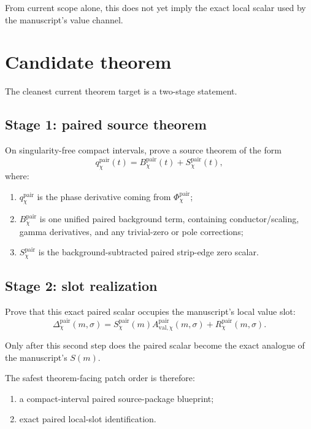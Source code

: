\documentclass[11pt]{article}
\begin{document}
From current scope alone, this does not yet imply the exact local scalar used by
the manuscript's value channel.

\section{Candidate theorem}

The cleanest current theorem target is a two-stage statement.

\subsection*{Stage 1: paired source theorem}

On singularity-free compact intervals, prove a source theorem of the form
\[
q_\chi^{\mathrm{pair}}(t)=B_\chi^{\mathrm{pair}}(t)+S_\chi^{\mathrm{pair}}(t),
\]
where:

\begin{enumerate}
\item \(q_\chi^{\mathrm{pair}}\) is the phase derivative coming from
\(\Phi_\chi^{\mathrm{pair}}\);
\item \(B_\chi^{\mathrm{pair}}\) is one unified paired background term,
containing conductor/scaling, gamma derivatives, and any trivial-zero or pole
corrections;
\item \(S_\chi^{\mathrm{pair}}\) is the background-subtracted paired strip-edge
zero scalar.
\end{enumerate}

\subsection*{Stage 2: slot realization}

Prove that this exact paired scalar occupies the manuscript's local value slot:
\[
\Delta_\chi^{\mathrm{pair}}(m,\sigma)
=
S_\chi^{\mathrm{pair}}(m)
A_{\mathrm{val},\chi}^{\mathrm{pair}}(m,\sigma)
+
R_\chi^{\mathrm{pair}}(m,\sigma).
\]

Only after this second step does the paired scalar become the exact analogue of
the manuscript's \(S(m)\).

The safest theorem-facing patch order is therefore:

\begin{enumerate}
\item a compact-interval paired source-package blueprint;
\item exact paired local-slot identification.
\end{enumerate}
\end{document}
